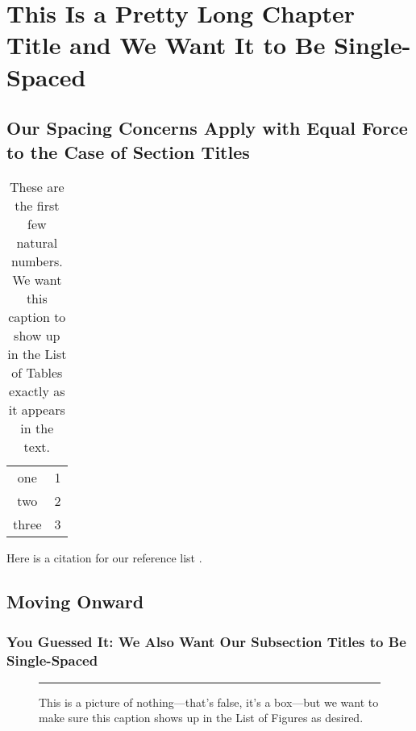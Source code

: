\chapter{This Is a Pretty Long Chapter Title and We Want It to Be
  Single-Spaced}

\blindtext[1]

\section{Our Spacing Concerns Apply with Equal Force to the Case of Section
  Titles}

\blindtext[1]

\begin{table}[h]
  \centering
  \begin{tabular}{cc}
    one & 1 \\
    two & 2 \\
    three & 3
  \end{tabular}
  \caption{These are the first few natural numbers.  We want this caption to show up in the List of Tables exactly as it appears in the text.}
  \label{tab:mytab}
\end{table}

Here is a citation for our reference list \citep{hhgg}.

\blindtext[1]

\section{Moving Onward}

\subsection{You Guessed It: We Also Want Our Subsection Titles to Be
  Single-Spaced}

\blindtext[1]

\begin{figure}[h]
  \centering
  \rule{2cm}{2cm}
  \caption{This is a picture of nothing---that's false, it's a box---but we want to make sure this caption shows up in the List of Figures as desired.}
  \label{fig:myfig}
\end{figure}

